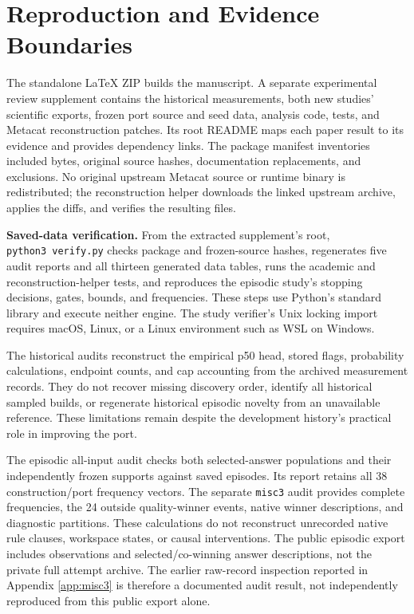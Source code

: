 \documentclass[10pt,letterpaper]{article}
\begin{document}
\clearpage


\appendix

\section{Reproduction and Evidence Boundaries}\label{app:artifacts}

The standalone LaTeX ZIP builds the manuscript. A separate experimental review supplement
contains the historical measurements, both new studies' scientific exports, frozen port
source and seed data, analysis code, tests, and Metacat reconstruction patches. Its root
README maps each paper result to its evidence and provides dependency links. The package
manifest inventories included bytes, original source hashes, documentation replacements,
and exclusions. No original upstream Metacat source or runtime binary is redistributed;
the reconstruction helper downloads the linked upstream archive, applies the diffs, and
verifies the resulting files.

\textbf{Saved-data verification.} From the extracted supplement's root,
\texttt{python3\ verify.py} checks package and frozen-source hashes, regenerates five
audit reports and all thirteen generated data tables, runs the academic and
reconstruction-helper tests, and reproduces the episodic study's stopping decisions,
gates, bounds, and frequencies. These steps use Python's standard library and execute
neither engine. The study verifier's Unix locking import requires macOS, Linux, or a Linux
environment such as WSL on Windows.

The historical audits reconstruct the empirical p50 head, stored flags, probability
calculations, endpoint counts, and cap accounting from the archived measurement records.
They do not recover missing discovery order, identify all historical sampled builds, or
regenerate historical episodic novelty from an unavailable reference. These limitations
remain despite the development history's practical role in improving the port.

The episodic all-input audit checks both selected-answer populations and their
independently frozen supports against saved episodes. Its report retains all 38
construction/port frequency vectors. The separate \texttt{misc3} audit provides complete
frequencies, the 24 outside quality-winner events, native winner descriptions, and
diagnostic partitions. These calculations do not reconstruct unrecorded native rule
clauses, workspace states, or causal interventions. The public episodic export includes
observations and selected/co-winning answer descriptions, not the private full attempt
archive. The earlier raw-record inspection reported in Appendix \ref{app:misc3} is
therefore a documented audit result, not independently reproduced from this public export
alone.
\end{document}
